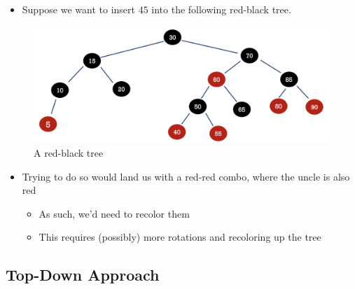 \documentclass[
  10pt,
  english,
  letterpaper,
,tablecaptionabove
]{scrartcl}
\providecommand{\tightlist}{%
  \setlength{\itemsep}{0pt}\setlength{\parskip}{0pt}}
\begin{document}
\begin{itemize}
\tightlist
\item
  Suppose we want to insert \(45\) into the following red-black tree.
\end{itemize}

\begin{figure}
\centering
\includegraphics[width=1\textwidth,height=\textheight]{images/4.png}
\caption{A red-black tree}
\end{figure}

\begin{itemize}
\tightlist
\item
  Trying to do so would land us with a red-red combo, where the uncle is
  also red

  \begin{itemize}
  \tightlist
  \item
    As such, we'd need to recolor them
  \item
    This requires (possibly) more rotations and recoloring up the tree
  \end{itemize}
\end{itemize}

\hypertarget{top-down-approach}{%
\subsection{Top-Down Approach}\label{top-down-approach}}
\end{document}
